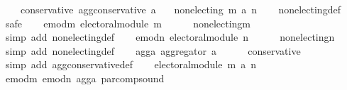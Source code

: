 \begin{isabellebody}
\ \ \ \ conservative{\isacharcolon}{\kern0pt}\ {\isachardoublequoteopen}agg{\isacharunderscore}{\kern0pt}conservative\ a{\isachardoublequoteclose}\isanewline
\ \ \ {\isachardoublequoteopen}non{\isacharunderscore}{\kern0pt}electing\ {\isacharparenleft}{\kern0pt}m\ {\isasymparallel}\isactrlsub a\ n{\isacharparenright}{\kern0pt}{\isachardoublequoteclose}\isanewline
%
\isadelimproof
\ \ %
\endisadelimproof
%
\isatagproof
{}\isamarkupfalse%
\ non{\isacharunderscore}{\kern0pt}electing{\isacharunderscore}{\kern0pt}def\isanewline
{}\isamarkupfalse%
\ {\isacharparenleft}{\kern0pt}safe{\isacharparenright}{\kern0pt}\isanewline
\ \ \isamarkupfalse%
\ emod{\isacharunderscore}{\kern0pt}m{\isacharcolon}{\kern0pt}\ {\isachardoublequoteopen}electoral{\isacharunderscore}{\kern0pt}module\ m{\isachardoublequoteclose}\isanewline
\ \ \ \ \isamarkupfalse%
\ non{\isacharunderscore}{\kern0pt}electing{\isacharunderscore}{\kern0pt}m\isanewline
\ \ \ \ \isamarkupfalse%
\ {\isacharparenleft}{\kern0pt}simp\ add{\isacharcolon}{\kern0pt}\ non{\isacharunderscore}{\kern0pt}electing{\isacharunderscore}{\kern0pt}def{\isacharparenright}{\kern0pt}\isanewline
\ \ \isamarkupfalse%
\ emod{\isacharunderscore}{\kern0pt}n{\isacharcolon}{\kern0pt}\ {\isachardoublequoteopen}electoral{\isacharunderscore}{\kern0pt}module\ n{\isachardoublequoteclose}\isanewline
\ \ \ \ \isamarkupfalse%
\ non{\isacharunderscore}{\kern0pt}electing{\isacharunderscore}{\kern0pt}n\isanewline
\ \ \ \ \isamarkupfalse%
\ {\isacharparenleft}{\kern0pt}simp\ add{\isacharcolon}{\kern0pt}\ non{\isacharunderscore}{\kern0pt}electing{\isacharunderscore}{\kern0pt}def{\isacharparenright}{\kern0pt}\isanewline
\ \ \isamarkupfalse%
\ agg{\isacharunderscore}{\kern0pt}a{\isacharcolon}{\kern0pt}\ {\isachardoublequoteopen}aggregator\ a{\isachardoublequoteclose}\isanewline
\ \ \ \ \isamarkupfalse%
\ conservative\isanewline
\ \ \ \ \isamarkupfalse%
\ {\isacharparenleft}{\kern0pt}simp\ add{\isacharcolon}{\kern0pt}\ agg{\isacharunderscore}{\kern0pt}conservative{\isacharunderscore}{\kern0pt}def{\isacharparenright}{\kern0pt}\isanewline
\ \ \isamarkupfalse%
\ {\isachardoublequoteopen}electoral{\isacharunderscore}{\kern0pt}module\ {\isacharparenleft}{\kern0pt}m\ {\isasymparallel}\isactrlsub a\ n{\isacharparenright}{\kern0pt}{\isachardoublequoteclose}\isanewline
\ \ \ \ \isamarkupfalse%
\ emod{\isacharunderscore}{\kern0pt}m\ emod{\isacharunderscore}{\kern0pt}n\ agg{\isacharunderscore}{\kern0pt}a\ par{\isacharunderscore}{\kern0pt}comp{\isacharunderscore}{\kern0pt}sound\isanewline

\end{isabellebody}

